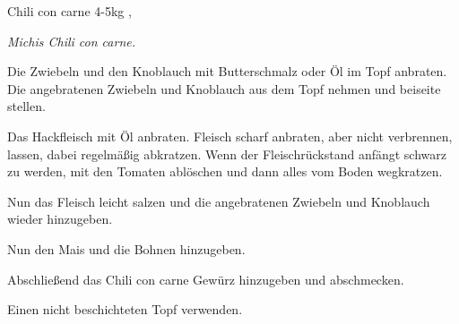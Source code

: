 \documentclass[../recipe-collections/cooking.tex]{subfiles}
\begin{document}
\begin{recipe}{Chili con carne} {4-5kg } {, }

  \freeform{}\textit{Michis Chili con carne.}


  Die Zwiebeln und den Knoblauch mit Butterschmalz oder Öl im Topf anbraten.
  Die angebratenen Zwiebeln und Knoblauch aus dem Topf nehmen und beiseite stellen.


  Das Hackfleisch mit Öl anbraten.
  Fleisch scharf anbraten, aber nicht verbrennen, lassen, dabei regelmäßig abkratzen.
  Wenn der Fleischrückstand anfängt schwarz zu werden, mit den Tomaten ablöschen und dann alles vom Boden wegkratzen.

  Nun das Fleisch leicht salzen und die angebratenen Zwiebeln und Knoblauch wieder hinzugeben.


  Nun den Mais und die Bohnen hinzugeben.


  Abschließend das Chili con carne Gewürz hinzugeben und abschmecken.

  \freeform{}\hrulefill{}

  \freeform{}
  Einen nicht beschichteten Topf verwenden.

\end{recipe}
\end{document}
